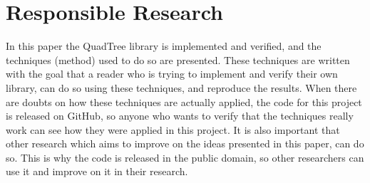 \section{Responsible Research}
In this paper the QuadTree library is implemented and verified, and the techniques (method) used to do so are presented. These techniques are written with the goal that a reader who is trying to implement and verify their own library, can do so using these techniques, and reproduce the results. When there are doubts on how these techniques are actually applied, the code for this project is released on GitHub, so anyone who wants to verify that the techniques really work can see how they were applied in this project. It is also important that other research which aims to improve on the ideas presented in this paper, can do so. This is why the code is released in the public domain, so other researchers can use it and improve on it in their research.
